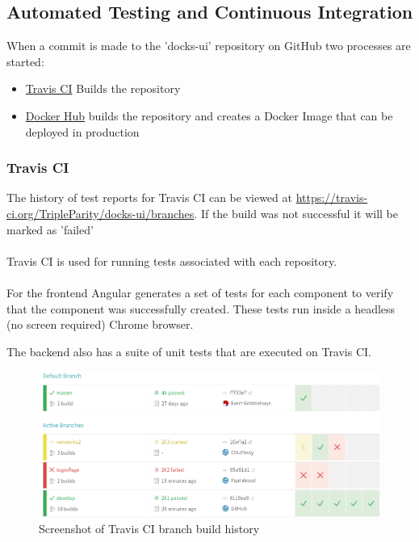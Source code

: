 \documentclass[]{article}
\begin{document}
\subsection{Automated Testing and Continuous Integration}
When a commit is made to the 'docks-ui' repository on GitHub two
processes are started:
\begin{itemize}
	\item \href{https://travis-ci.org/TripleParity/docks-ui/branches}{Travis CI} Builds the repository
	\item \href{https://hub.docker.com/r/tripleparity/docks-ui/builds/}{Docker Hub} builds the repository and creates a Docker Image that can be deployed in production
\end{itemize}

\subsubsection{Travis CI}
The history of test reports for Travis CI can be viewed at \url{https://travis-ci.org/TripleParity/docks-ui/branches}.
If the build was not successful it will be marked as 'failed' \\
\\
Travis CI is used for running tests associated with each repository. \\
\\
For the frontend Angular generates a set of tests for each component to verify
that the component was successfully created. These tests run inside a
headless (no screen required) Chrome browser.

The backend also has a suite of unit tests that are executed on Travis CI.

\begin{figure}[H]
	\centering
	\includegraphics[scale=0.5]{travis_build_history.png}
	\caption{Screenshot of Travis CI branch build history}
\end{figure}
\end{document}
